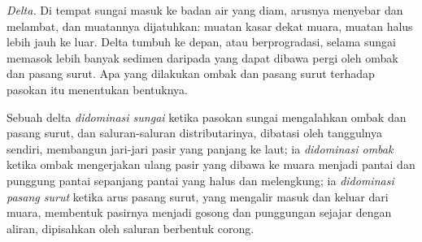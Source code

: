 \emph{Delta.} Di tempat sungai masuk ke badan air yang diam, arusnya menyebar dan melambat, dan muatannya dijatuhkan: muatan kasar dekat muara, muatan halus lebih jauh ke luar. Delta tumbuh ke depan, atau berprogradasi, selama sungai memasok lebih banyak sedimen daripada yang dapat dibawa pergi oleh ombak dan pasang surut. Apa yang dilakukan ombak dan pasang surut terhadap pasokan itu menentukan bentuknya.

\begin{definition}\label{def:b1:clastic-sediments:delta}
Sebuah delta \emph{didominasi sungai} ketika pasokan sungai mengalahkan ombak dan pasang surut, dan saluran-saluran distributarinya, dibatasi oleh tanggulnya sendiri, membangun jari-jari pasir yang panjang ke laut; ia \emph{didominasi ombak} ketika ombak mengerjakan ulang pasir yang dibawa ke muara menjadi pantai dan punggung pantai sepanjang pantai yang halus dan melengkung; ia \emph{didominasi pasang surut} ketika arus pasang surut, yang mengalir masuk dan keluar dari muara, membentuk pasirnya menjadi gosong dan punggungan sejajar dengan aliran, dipisahkan oleh saluran berbentuk corong.
\end{definition}

